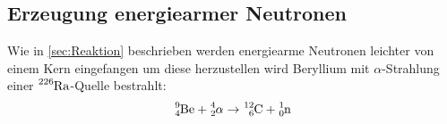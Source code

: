 \subsection{Erzeugung energiearmer Neutronen}

Wie in \ref{sec:Reaktion} beschrieben werden energiearme Neutronen leichter von einem Kern eingefangen um diese herzustellen wird Beryllium mit $\alpha$-Strahlung einer $\ce{^{226}_{}Ra}$-Quelle bestrahlt:
\begin{equation}
\ce{^{9}_{4}Be} + \ce{^{4}_{2}\alpha}\rightarrow \ce{^{12}_{6}C}+\ce{^{1}_{0}n}
\end{equation}
